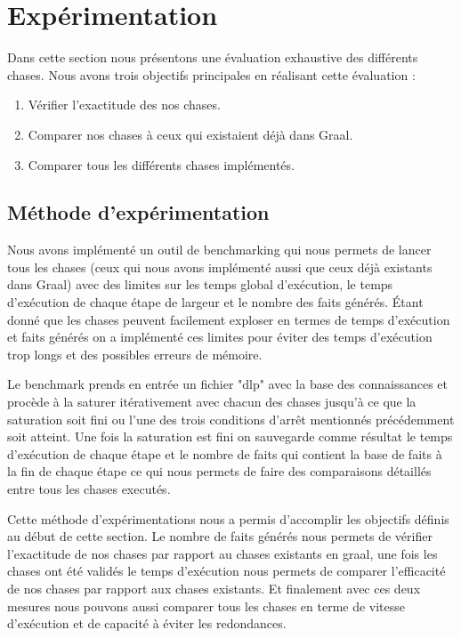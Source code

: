 \section{Expérimentation}\label{sec:experimentation}

Dans cette section nous présentons une évaluation exhaustive des différents chases. Nous avons trois objectifs principales en réalisant cette évaluation :

\begin{enumerate}
  \item Vérifier l'exactitude des nos chases.
  \item Comparer nos chases à ceux qui existaient déjà dans Graal.
  \item Comparer tous les différents chases implémentés. 
\end{enumerate}

\subsection{Méthode d'expérimentation}

Nous avons implémenté un outil de benchmarking qui nous permets de lancer tous les chases (ceux qui nous avons implémenté aussi que ceux déjà existants dans Graal) avec des limites sur les temps global d'exécution, le temps d'exécution de chaque étape de largeur et le nombre des faits générés. Étant donné que les chases peuvent facilement exploser en termes de temps d'exécution et faits générés on a implémenté ces limites pour éviter des temps d'exécution trop longs et des possibles erreurs de mémoire. 

Le benchmark prends en entrée un fichier "dlp" avec la base des connaissances et procède à la saturer itérativement avec chacun des chases jusqu'à ce que la saturation soit fini ou l'une des trois conditions d'arrêt mentionnés précédemment soit atteint. Une fois la saturation est fini on sauvegarde comme résultat le temps d'exécution de chaque étape et le nombre de faits qui contient la base de faits à la fin de chaque étape ce qui nous permets de faire des comparaisons détaillés entre tous les chases executés.

Cette méthode d'expérimentations nous a permis d'accomplir les objectifs définis au début de cette section. Le nombre de faits générés nous permets de vérifier l'exactitude de nos chases par rapport au chases existants en graal, une fois les chases ont été validés le temps d'exécution nous permets de comparer l'efficacité de nos chases par rapport aux chases existants. Et finalement avec ces deux mesures nous pouvons aussi comparer tous les chases en terme de vitesse d'exécution et de capacité à éviter les redondances.

